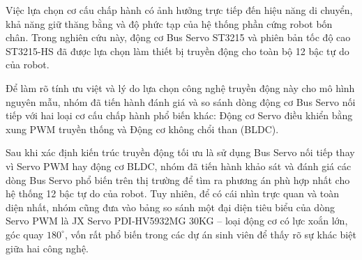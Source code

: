 Việc lựa chọn cơ cấu chấp hành có ảnh hưởng trực tiếp đến hiệu năng di chuyển, khả năng giữ thăng bằng và độ phức tạp của hệ thống phần cứng robot bốn chân. Trong nghiên cứu này, động cơ Bus Servo ST3215 và phiên bản tốc độ cao ST3215-HS \cite{waveshare_st3215} đã được lựa chọn làm thiết bị truyền động cho toàn bộ 12 bậc tự do của robot. 

Để làm rõ tính ưu việt và lý do lựa chọn công nghệ truyền động này cho mô hình nguyên mẫu, nhóm đã tiến hành đánh giá và so sánh dòng động cơ Bus Servo nối tiếp với hai loại cơ cấu chấp hành phổ biến khác: Động cơ Servo điều khiển bằng xung PWM truyền thống và Động cơ không chổi than (BLDC).

\begin{table}[H]
\centering
\caption{Bảng so sánh các loại cơ cấu chấp hành áp dụng cho Robot bốn chân}
\label{tab:motor_comparison}
\renewcommand{\arraystretch}{1.3}
\end{table}

Sau khi xác định kiến trúc truyền động tối ưu là sử dụng Bus Servo nối tiếp thay vì Servo PWM hay động cơ BLDC, nhóm đã tiến hành khảo sát và đánh giá các dòng Bus Servo phổ biến trên thị trường để tìm ra phương án phù hợp nhất cho hệ thống 12 bậc tự do của robot. Tuy nhiên, để có cái nhìn trực quan và toàn diện nhất, nhóm cũng đưa vào bảng so sánh một đại diện tiêu biểu của dòng Servo PWM là JX Servo PDI-HV5932MG 30KG -- loại động cơ có lực xoắn lớn, góc quay $180^{\circ}$, vốn rất phổ biến trong các dự án sinh viên để thấy rõ sự khác biệt giữa hai công nghệ.

